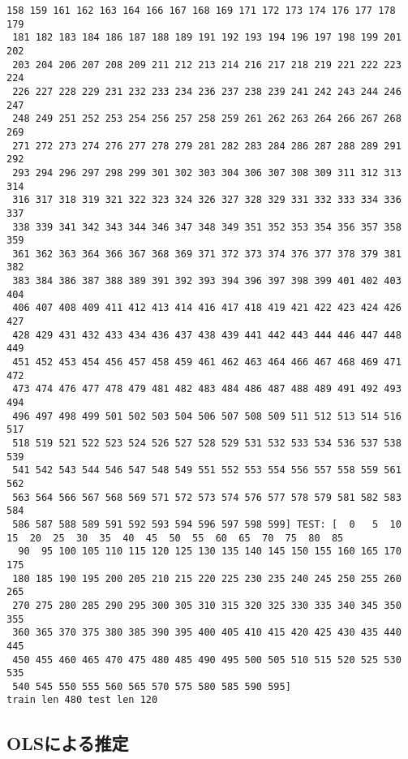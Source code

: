 \documentclass[11pt]{article}
\begin{document}
\begin{Verbatim}[commandchars=\\\{\}]
 158 159 161 162 163 164 166 167 168 169 171 172 173 174 176 177 178 179
 181 182 183 184 186 187 188 189 191 192 193 194 196 197 198 199 201 202
 203 204 206 207 208 209 211 212 213 214 216 217 218 219 221 222 223 224
 226 227 228 229 231 232 233 234 236 237 238 239 241 242 243 244 246 247
 248 249 251 252 253 254 256 257 258 259 261 262 263 264 266 267 268 269
 271 272 273 274 276 277 278 279 281 282 283 284 286 287 288 289 291 292
 293 294 296 297 298 299 301 302 303 304 306 307 308 309 311 312 313 314
 316 317 318 319 321 322 323 324 326 327 328 329 331 332 333 334 336 337
 338 339 341 342 343 344 346 347 348 349 351 352 353 354 356 357 358 359
 361 362 363 364 366 367 368 369 371 372 373 374 376 377 378 379 381 382
 383 384 386 387 388 389 391 392 393 394 396 397 398 399 401 402 403 404
 406 407 408 409 411 412 413 414 416 417 418 419 421 422 423 424 426 427
 428 429 431 432 433 434 436 437 438 439 441 442 443 444 446 447 448 449
 451 452 453 454 456 457 458 459 461 462 463 464 466 467 468 469 471 472
 473 474 476 477 478 479 481 482 483 484 486 487 488 489 491 492 493 494
 496 497 498 499 501 502 503 504 506 507 508 509 511 512 513 514 516 517
 518 519 521 522 523 524 526 527 528 529 531 532 533 534 536 537 538 539
 541 542 543 544 546 547 548 549 551 552 553 554 556 557 558 559 561 562
 563 564 566 567 568 569 571 572 573 574 576 577 578 579 581 582 583 584
 586 587 588 589 591 592 593 594 596 597 598 599] TEST: [  0   5  10  15  20  25  30  35  40  45  50  55  60  65  70  75  80  85
  90  95 100 105 110 115 120 125 130 135 140 145 150 155 160 165 170 175
 180 185 190 195 200 205 210 215 220 225 230 235 240 245 250 255 260 265
 270 275 280 285 290 295 300 305 310 315 320 325 330 335 340 345 350 355
 360 365 370 375 380 385 390 395 400 405 410 415 420 425 430 435 440 445
 450 455 460 465 470 475 480 485 490 495 500 505 510 515 520 525 530 535
 540 545 550 555 560 565 570 575 580 585 590 595]
train len 480 test len 120

    \end{Verbatim}

    \subsection{OLSによる推定}\label{olsux306bux3088ux308bux63a8ux5b9a}
\end{document}

